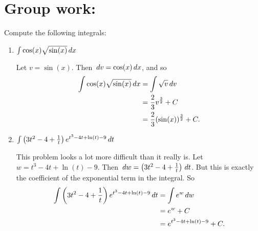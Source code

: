 \documentclass[handout,nooutcomes]{ximera}
\begin{document}
		
		

	
	
	
	
	

\section*{Group work:}
















\begin{problem}
Compute the following integrals:

	\begin{enumerate}
	
	\item  $\int \cos(x) \sqrt{\sin(x)} \,d x$
		\begin{freeResponse}
		Let $v = \sin(x)$.  Then $\,d v = \cos(x) \,d x$, and so
			\begin{align*}
			\int \cos(x) \sqrt{\sin(x)} \,d x &= \int \sqrt{v} \,d v  \\
			&= \frac{2}{3} v^{\frac{3}{2}} + C  \\
			&= \frac{2}{3} (\sin(x))^{\frac{3}{2}} + C.
			\end{align*}
		\end{freeResponse}
		
		
		
	\item  $\int \left( 3t^2 - 4 + \frac{1}{t} \right) e^{t^3 - 4t + \ln(t) - 9} \,d t$
		\begin{freeResponse}
		This problem looks a lot more difficult than it really is.  Let $w=t^3 - 4t + \ln(t) - 9$.  
		Then $\,d w = \left( 3t^2 - 4 + \frac{1}{t} \right) \,d t$.  But this is exactly the coefficient of the exponential term in the integral.  So
			\begin{align*}
			\int \left( 3t^2 - 4 + \frac{1}{t} \right) e^{t^3 - 4t + \ln(t) - 9} \,d t &= \int e^w \,d w  \\
			&= e^w + C  \\
			&= e^{t^3 - 4t + \ln(t) - 9} + C.
			\end{align*}
		\end{freeResponse}
		
		
		
	\end{enumerate}
		
		
		

\end{problem}
	
\end{document}
